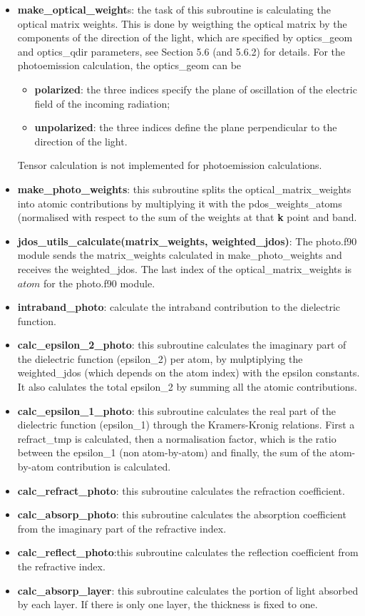 \documentclass[a4paper,11pt,twoside]{book}
\begin{document}
\begin{itemize}
\item  {\bf make\_optical\_weight}s: the task of this subroutine is
	calculating the optical matrix weights.
	This is done by weigthing the optical matrix by the components of the direction of the light,
	which are specified by optics\_geom and optics\_qdir
	parameters, see Section 5.6 (and 5.6.2) for details.
	For the photoemission calculation, the optics\_geom can be
	\begin{itemize}
        \item {\bf polarized}: the three indices specify the
		plane of oscillation of the electric field
		of the incoming radiation;
        \item {\bf unpolarized}: the three indices define the
		plane perpendicular to the direction
		of the light.
	\end{itemize}
   Tensor calculation is not implemented for photoemission calculations.
\item  {\bf make\_photo\_weights}: this subroutine splits the optical\_matrix\_weights
	into atomic contributions by multiplying it with the pdos\_weights\_atoms
	(normalised with respect to the sum of the weights at that {\bf k} point and band.

\item  {\bf jdos\_utils\_calculate(matrix\_weights, weighted\_jdos)}:
       The photo.f90 module sends the matrix\_weights calculated in make\_photo\_weights and receives the
       weighted\_jdos. The last index of the optical\_matrix\_weights is $atom$ for the photo.f90 module.

\item  {\bf intraband\_photo}: calculate the intraband contribution to the dielectric function.

\item  {\bf calc\_epsilon\_2\_photo}: this subroutine calculates the imaginary part of the dielectric function (epsilon\_2) per atom, by mulptiplying the weighted\_jdos (which depends on the atom index) with the epsilon constants.
	It also calulates the total epsilon\_2 by summing all the atomic contributions.
\item  {\bf calc\_epsilon\_1\_photo}: this subroutine calculates the real part of the dielectric function (epsilon\_1) through the Kramers-Kronig relations.
	First a refract\_tmp is calculated, then a normalisation factor, which is the ratio between the epsilon\_1 (non atom-by-atom) and finally, the sum of the atom-by-atom contribution is calculated.
\item  {\bf calc\_refract\_photo}: this subroutine
	calculates the refraction coefficient.
\item  {\bf calc\_absorp\_photo}: this subroutine
       calculates the absorption coefficient from the
       imaginary part of the refractive index.
\item  {\bf calc\_reflect\_photo}:this subroutine
       calculates the reflection coefficient from the
       refractive index.
\item  {\bf calc\_absorp\_layer}: this subroutine calculates
	the portion of light absorbed by each layer.
	If there is only one layer, the thickness is fixed to one.


\end{itemize}
\end{document}
